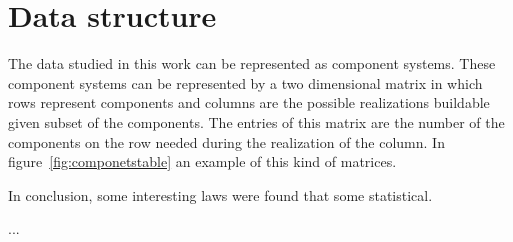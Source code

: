 \chapter{Data structure}\label{ch:structure}

The data studied in this work can be represented as component systems. These component systems can be represented by a two dimensional matrix in which rows represent components and columns are the possible realizations buildable given subset of the components. The entries of this matrix are the number of the components on the row needed during the realization of the column. In figure~\ref{fig:componetstable} an example of this kind of matrices.









In conclusion, some interesting laws were found that some statistical.

...